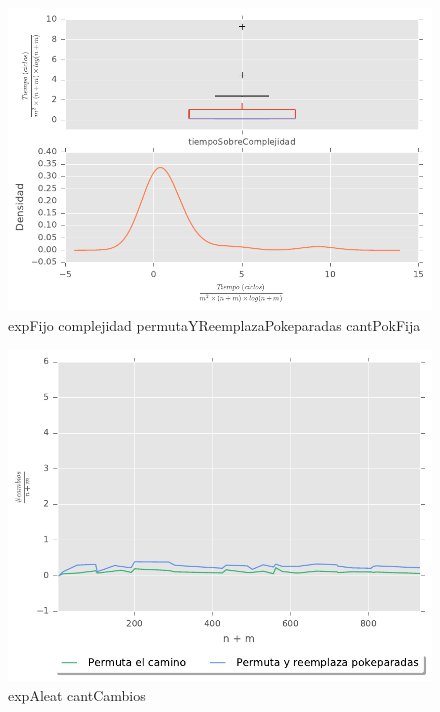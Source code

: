 \begin{figure}[H]
  \begin{center}
    \includegraphics{../experimentacion/ej3/expFijo_complejidad_permutaYReemplazaPokeparadas_cantPokFija.pdf}
    \caption{expFijo complejidad permutaYReemplazaPokeparadas cantPokFija}
    \label{fig:expFijo_complejidad_permutaYReemplazaPokeparadas_cantPokFija}
  \end{center}
\end{figure}

\begin{figure}[H]
  \begin{center}
    \includegraphics{../experimentacion/ej3/expAleat_cantCambios.pdf}
    \caption{expAleat cantCambios}
    \label{fig:expAleat_cantCambios}
  \end{center}
\end{figure}

